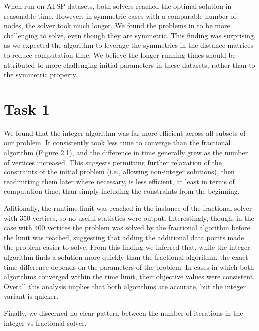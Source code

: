 \documentclass[12pt]{article}
\numberwithin{equation}{section}
\begin{document}
When run on ATSP datasets, both solvers reached the optimal solution in reasonable time. However, in symmetric cases with a comparable number of nodes, the solver took much longer. We found the problems in \cite{web:tsp} to be more challenging to solve, even though they are symmetric. This finding was surprising, as we expected the algorithm to leverage the symmetries in the distance matrices to reduce computation time. We believe the longer running times should be attributed to more challenging initial parameters in these datasets, rather than to the symmetric property. 

\section{Task 1}

 We found that the integer algorithm was far more efficient across all subsets of our problem. It consistently took less time to converge than the fractional algorithm (Figure 2.1), and the difference in time generally grew as the number of vertices increased. This suggests permitting further relaxation of the constraints of the initial problem (i.e., allowing non-integer solutions), then readmitting them later where necessary, is less efficient, at least in terms of computation time, than simply including the constraints from the beginning. 
 
 Aditionally, the runtime limit was reached in the instance of the fractional solver with 350 vertices, so no useful statistics were output. Interestingly, though, in the case with 400 vertices the problem was solved by the fractional algorithm before the limit was reached, suggesting that adding the additional data points made the problem easier to solve. From this finding we inferred that, while the integer algorithm finds a solution more quickly than the fractional algorithm, the exact time difference depends on the parameters of the problem. In cases in which both algorithms converged within the time limit, their objective values were consistent. Overall this analysis implies that both algorithms are accurate, but the integer variant is quicker. 
 
 Finally, we discerned no clear pattern between the number of iterations in the integer vs fractional solver.
\end{document}
